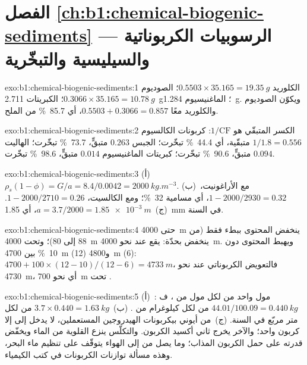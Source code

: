 \section*{الفصل \ref{ch:b1:chemical-biogenic-sediments} --- الرسوبيات الكربوناتية والسيليسية والتبخّرية}

\begin{solution}{exo:b1:chemical-biogenic-sediments:1}
الكلوريد $0.5503\times35.165 = \qty{19.35}{g}$؛ الصوديوم $0.3066\times35.165 =
\qty{10.78}{g}$؛ الكبريتات \qty{2.711}{g}؛ الماغنيسيوم \qty{1.284}{g}. ويكوّن الصوديوم والكلوريد معًا $0.5503 + 0.3066 = 0.857$، أي \qty{85.7}{\%} من الملح.
\end{solution}

\begin{solution}{exo:b1:chemical-biogenic-sediments:2}
الكسر المتبقّي هو $1/\mathrm{CF}$: كربونات الكالسيوم $1/1.8 = 0.556$ متبقّية، أي \qty{44.4}{\%} تبخّرت؛ الجبس $0.263$ متبقٍّ، \qty{73.7}{\%} تبخّرت؛ الهاليت $0.094$ متبقٍّ، \qty{90.6}{\%} تبخّرت؛ كبريتات الماغنيسيوم $0.014$ متبقٍّ، \qty{98.6}{\%} تبخّرت.
\end{solution}

\begin{solution}{exo:b1:chemical-biogenic-sediments:3}
(أ)~$\rho_s(1-\phi) = G/a = 8.4/0.0042 = \qty{2000}{kg.m^{-3}}$. (ب)~مع الأراغونيت، $1 - 2000/2930 = 0.32$، أي مسامية \qty{32}{\%}؛ ومع الكالسيت، $1 - 2000/2710 = 0.26$. (ج)~$a = 3.7/2000 = \qty{1.85e-3}{m}$، أي \qty{1.85}{mm} في السنة.
\end{solution}

\begin{solution}{exo:b1:chemical-biogenic-sediments:4}
حتى \qty{4000}{m} ينخفض المحتوى ببطء فقط (من 88 إلى 80)؛ وتحت \qty{4000}{m} ينخفض بحدّة:  يقع عند نحو \qty{4000}{m}. ويهبط المحتوى دون \qty{10}{\%} بين \qty{4700}{m} (12) و\qty{4800}{m} (6): $4700 + 100\times(12-10)/(12-6) = \qty{4733}{m}$، فالتعويض الكربوناتي عند نحو \qty{4730}{m}، أي نحو \qty{700}{m} تحت .
\end{solution}

\begin{solution}{exo:b1:chemical-biogenic-sediments:5}
(أ)~: مول واحد من  لكل مول من ، ف$44.01/100.09 = \qty{0.440}{kg}$ من  لكل كيلوغرام من . (ب)~$3.7\times0.440 = \qty{1.63}{kg}$ من  لكل متر مربّع في السنة. (ج)~من أيوني بيكربونات الهيدروجين المستعملين، لا يدخل إلى  إلا كربون واحد؛ والآخر يخرج ثاني أكسيد الكربون. والتكلّس ينزع القلوية من الماء ويخفّض قدرته على حمل الكربون المذاب؛ وما يصل من  إلى الهواء يتوقّف على تنظيم ماء البحر، وهذه مسألة توازنات الكربونات في كتب الكيمياء.
\end{solution}

